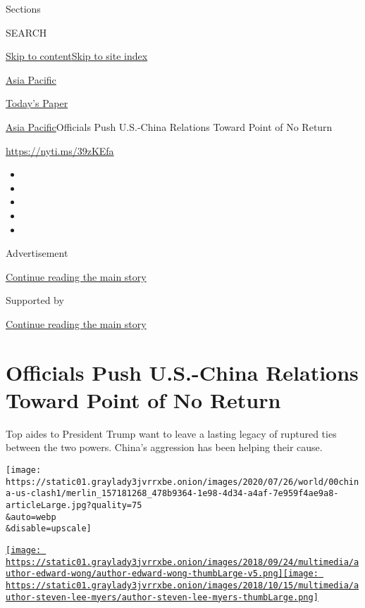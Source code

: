 Sections

SEARCH

\protect\hyperlink{site-content}{Skip to
content}\protect\hyperlink{site-index}{Skip to site index}

\href{https://www.nytimes3xbfgragh.onion/section/world/asia}{Asia
Pacific}

\href{https://myaccount.nytimes3xbfgragh.onion/auth/login?response_type=cookie\&client_id=vi}{}

\href{https://www.nytimes3xbfgragh.onion/section/todayspaper}{Today's
Paper}

\href{/section/world/asia}{Asia Pacific}\textbar{}Officials Push
U.S.-China Relations Toward Point of No Return

\url{https://nyti.ms/39zKEfa}

\begin{itemize}
\item
\item
\item
\item
\item
\end{itemize}

Advertisement

\protect\hyperlink{after-top}{Continue reading the main story}

Supported by

\protect\hyperlink{after-sponsor}{Continue reading the main story}

\hypertarget{officials-push-us-china-relations-toward-point-of-no-return}{%
\section{Officials Push U.S.-China Relations Toward Point of No
Return}\label{officials-push-us-china-relations-toward-point-of-no-return}}

Top aides to President Trump want to leave a lasting legacy of ruptured
ties between the two powers. China's aggression has been helping their
cause.

\texttt{[image: https://static01.graylady3jvrrxbe.onion/images/2020/07/26/world/00china-us-clash1/merlin\_157181268\_478b9364-1e98-4d34-a4af-7e959f4ae9a8-articleLarge.jpg?quality=75\\\&auto=webp\\\&disable=upscale]}

\href{https://www.nytimes3xbfgragh.onion/by/edward-wong}{\texttt{[image: https://static01.graylady3jvrrxbe.onion/images/2018/09/24/multimedia/author-edward-wong/author-edward-wong-thumbLarge-v5.png]}}\href{https://www.nytimes3xbfgragh.onion/by/steven-lee-myers}{\texttt{[image: https://static01.graylady3jvrrxbe.onion/images/2018/10/15/multimedia/author-steven-lee-myers/author-steven-lee-myers-thumbLarge.png]}}


